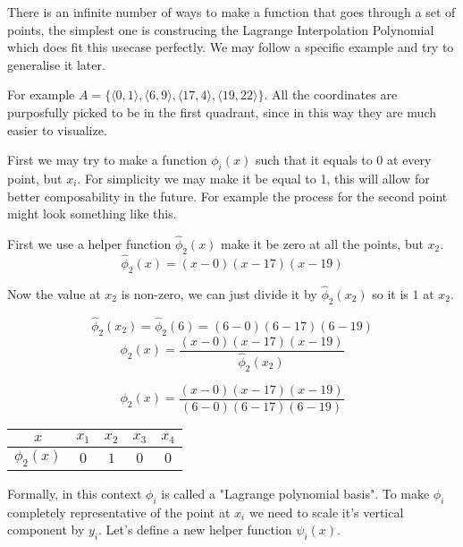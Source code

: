 \documentclass[12pt, titlepage]{article}
\begin{document}
There is an infinite number of ways to make a function that goes through a set of
points, the simplest one is construcing the Lagrange Interpolation Polynomial
which does fit this usecase perfectly. We may follow a specific example 
and try to generalise it later. 

For example $A = \{\langle 0, 1 \rangle, \langle 6, 9 \rangle, 
\langle 17, 4 \rangle, \langle 19, 22 \rangle\}$. All the coordinates are
purposfully picked to be in the first quadrant, since in this way they are
much easier to visualize.

First we may try to make a function $\phi_i(x)$ such that it equals to 0 at
every point, but $x_i$. For simplicity we may make it be equal to 1, this will
allow for better composability in the future. For example the process for 
the second point might look something like this.

First we use a helper function $\hat{\phi}_2(x)$ make it be zero at all the points, but $x_2$.
\begin{equation}
    \hat{\phi}_2(x) = (x - 0)(x - 17)(x - 19)
\end{equation}

Now the value at $x_2$ is non-zero, we can just divide it by $\hat{\phi}_2(x_2)$ 
so it is $1$ at $x_2$.

\begin{equation}
    \hat{\phi}_2(x_2) = \hat{\phi}_2(6) = (6 - 0)(6 - 17)(6 - 19)
\end{equation}
\begin{equation}
    \phi_2(x) = \frac{(x - 0)(x - 17)(x - 19)}{\hat{\phi}_2(x_2)}
\end{equation}

\begin{equation}
    \phi_2(x) = \frac{(x - 0)(x - 17)(x - 19)}{(6 - 0)(6 - 17)(6 - 19)}
\end{equation}

{
\centering
\begin{tabular}{c|c c c c}
    $x$ & $x_1$ & $x_2$ & $x_3$ & $x_4$ \\
    \hline
    $\phi_2(x)$ & $0$ & $1$ & $0$ & $0$ \\
\end{tabular}\par
}

Formally, in this context $\phi_i$ is called a "Lagrange polynomial basis".
To make $\phi_i$ completely representative of the point at $x_i$ we need to 
scale it's vertical component by $y_i$. Let's define a new helper 
function $\psi_i(x)$.
\end{document}
